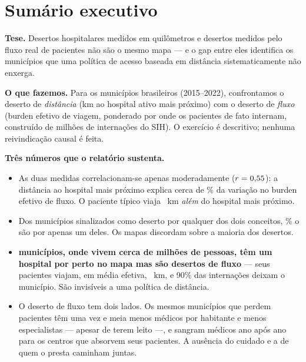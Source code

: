 
\section*{Sumário executivo}

\noindent\textbf{Tese.} Desertos hospitalares medidos em quilômetros e desertos
medidos pelo fluxo real de pacientes não são o mesmo mapa --- e o gap entre eles
identifica os municípios que uma política de acesso baseada em distância
sistematicamente não enxerga.

\medskip
\noindent\textbf{O que fazemos.} Para os \valNmunic{} municípios brasileiros
(2015--2022), confrontamos o deserto de \emph{distância} (km ao hospital ativo
mais próximo) com o deserto de \emph{fluxo} (burden efetivo de viagem, ponderado
por onde os pacientes de fato internam, construído de \valNaih{} milhões de
internações do SIH). O exercício é descritivo; nenhuma reivindicação causal é
feita.

\medskip
\noindent\textbf{Três números que o relatório sustenta.}
\begin{itemize}
\item As duas medidas correlacionam-se apenas moderadamente ($r=0{,}55$): a
  distância ao hospital mais próximo explica cerca de \valRtwoFD\% da variação no
  burden efetivo de fluxo. O paciente típico viaja \valMedGap~km \emph{além} do
  hospital mais próximo.
\item Dos municípios sinalizados como deserto por qualquer dos dois conceitos,
  \valPctDisagree\% o são por apenas um deles. Os mapas discordam sobre a maioria
  dos desertos.
\item \textbf{\valFOn{} municípios, onde vivem cerca de \valFOpop{} milhões de
  pessoas, têm um hospital por perto no mapa mas são desertos de fluxo} --- seus
  pacientes viajam, em média efetiva, \valFOf~km, e 90\% das internações deixam o
  município. São invisíveis a uma política de distância.
\item O deserto de fluxo tem dois lados. Os mesmos municípios que perdem
  pacientes têm uma vez e meia menos médicos por habitante e menos especialistas
  --- apesar de terem leito ---, e sangram médicos ano após ano para os centros
  que absorvem seus pacientes. A ausência do cuidado e a de quem o presta
  caminham juntas.
\end{itemize}

